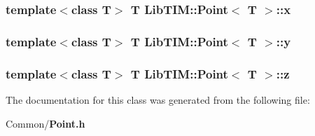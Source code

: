 \subsubsection{\setlength{\rightskip}{0pt plus 5cm}template$<$class T$>$ T {\bf Lib\-TIM::Point}$<$ T $>$::{\bf x}}\label{classLibTIM_1_1Point_o0}


\subsubsection{\setlength{\rightskip}{0pt plus 5cm}template$<$class T$>$ T {\bf Lib\-TIM::Point}$<$ T $>$::{\bf y}}\label{classLibTIM_1_1Point_o1}


\subsubsection{\setlength{\rightskip}{0pt plus 5cm}template$<$class T$>$ T {\bf Lib\-TIM::Point}$<$ T $>$::{\bf z}}\label{classLibTIM_1_1Point_o2}




The documentation for this class was generated from the following file:\begin{CompactItemize}
\item 
Common/{\bf Point.h}\end{CompactItemize}
